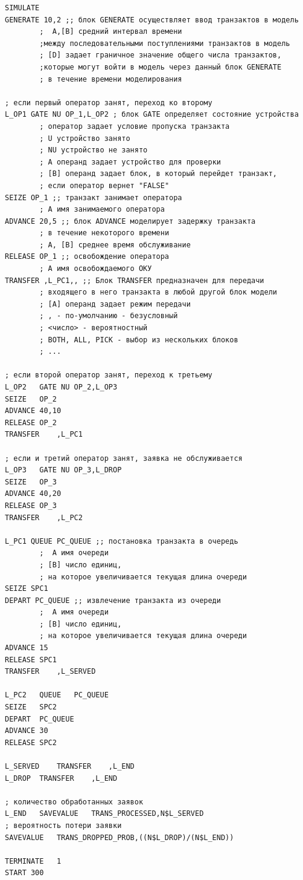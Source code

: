 \documentclass[a4paper,12pt]{article}
\begin{document}
	\begin{verbatim}
SIMULATE
GENERATE 10,2 ;; блок GENERATE осуществляет ввод транзактов в модель
		;  A,[B] средний интервал времени 
		;между последовательными поступлениями транзактов в модель
		; [D] задает граничное значение общего числа транзактов, 
		;которые могут войти в модель через данный блок GENERATE
		; в течение времени моделирования

; если первый оператор занят, переход ко второму
L_OP1 GATE NU OP_1,L_OP2 ; блок GATE определяет состояние устройства
		; оператор задает условие пропуска транзакта
		; U устройство занято
		; NU устройство не занято
		; A	операнд задает устройство для проверки
		; [B] операнд задает блок, в который перейдет транзакт, 
		; если оператор вернет "FALSE" 
SEIZE OP_1 ;; транзакт занимает оператора
		; A	имя занимаемого оператора
ADVANCE	20,5 ;; блок ADVANCE моделирует задержку транзакта
		; в течение некоторого времени
		; A, [B] среднее время обслуживание
RELEASE	OP_1 ;; освобождение оператора
		; A	имя освобождаемого ОКУ
TRANSFER ,L_PC1,, ;; Блок TRANSFER предназначен для передачи 
		; входящего в него транзакта в любой другой блок модели
		; [A] операнд задает режим передачи
		; , - по-умолчанию - безусловный
		; <число> - вероятностный
		; BOTH, ALL, PICK - выбор из нескольких блоков
		; ...

; если второй оператор занят, переход к третьему
L_OP2	GATE NU	OP_2,L_OP3	
SEIZE	OP_2
ADVANCE	40,10
RELEASE	OP_2
TRANSFER	,L_PC1

; если и третий оператор занят, заявка не обслуживается
L_OP3	GATE NU	OP_3,L_DROP	
SEIZE	OP_3
ADVANCE	40,20
RELEASE	OP_3
TRANSFER	,L_PC2

L_PC1 QUEUE PC_QUEUE ;; постановка транзакта в очередь
		;  A имя очереди
		; [B] число единиц, 
		; на которое увеличивается текущая длина очереди
SEIZE SPC1
DEPART PC_QUEUE	;; извлечение транзакта из очереди
		;  A имя очереди
		; [B] число единиц, 
		; на которое увеличивается текущая длина очереди
ADVANCE	15
RELEASE	SPC1
TRANSFER	,L_SERVED

L_PC2	QUEUE	PC_QUEUE
SEIZE	SPC2
DEPART	PC_QUEUE
ADVANCE	30
RELEASE	SPC2

L_SERVED	TRANSFER	,L_END
L_DROP	TRANSFER	,L_END

; количество обработанных заявок
L_END	SAVEVALUE	TRANS_PROCESSED,N$L_SERVED
; вероятность потери заявки
SAVEVALUE	TRANS_DROPPED_PROB,((N$L_DROP)/(N$L_END))

TERMINATE	1
START 300
	\end{verbatim}
	
\end{document}
